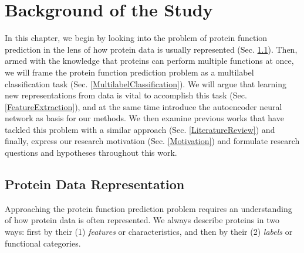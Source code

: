 %
%
%
%
%

\chapter{Background of the Study}
\label{BackgroundChapter}

\par In this chapter, we begin by looking into the problem of protein
function prediction in the lens of how protein data is usually represented
(Sec. \ref{ProteinFunctionPrediction}). Then, armed with the knowledge that
proteins can perform multiple functions at once, we will frame the protein
function prediction problem as a multilabel classification task (Sec.
\ref{MultilabelClassification}). We will argue that learning new
representations from data is vital to accomplish this task (Sec.
\ref{FeatureExtraction}), and at the same time introduce the autoencoder
neural network as basis for our methods. We then examine
previous works that have tackled this problem with a similar approach (Sec.
\ref{LiteratureReview}) and finally, express our research motivation
(Sec. \ref{Motivation}) and formulate research questions and hypotheses
throughout this work.


\section{Protein Data Representation}
\label{ProteinFunctionPrediction}

Approaching the protein function prediction problem requires an
understanding of how protein data is often represented. We always
describe proteins in two ways: first by their (1) \textit{features} or
characteristics, and then by their (2) \textit{labels} or functional
categories.

